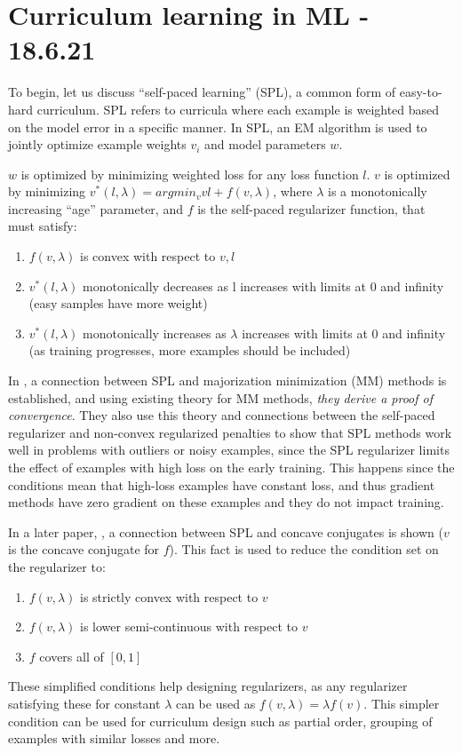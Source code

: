 \documentclass[letterpaper]{article}
\theoremstyle{definition}
\begin{document}
\section{Curriculum learning in ML - 18.6.21} \label{sec:CLML}

To begin, let us discuss ``self-paced learning'' (SPL), a common form of easy-to-hard curriculum.
SPL refers to curricula where each example is weighted based on the model error in a specific manner.
In SPL, an EM algorithm is used to jointly optimize example weights $v_i$ and model parameters $w$.

$w$ is optimized by minimizing weighted loss for any loss function $l$.
$v$ is optimized by minimizing $v^*(l,\lambda)=argmin_{v} vl + f(v, \lambda)$, where $\lambda$ is a monotonically increasing ``age'' parameter, and $f$ is the self-paced regularizer function, that must satisfy:
\begin{enumerate}
	\item $f(v, \lambda)$ is convex with respect to $v, l$
	\item $v^*(l,\lambda)$ monotonically decreases as l increases with limits at 0 and infinity (easy samples have more weight)
	\item $v^*(l,\lambda)$ monotonically increases as $\lambda$ increases with limits at 0 and infinity (as training progresses, more examples should be included)
\end{enumerate}

In \cite{Meng2017}, a connection between SPL and majorization minimization (MM) methods is established, and using existing theory for MM methods, \emph{they derive a proof of convergence}. They also use this theory and connections between the self-paced regularizer and non-convex regularized penalties to show that SPL methods work well in problems with outliers or noisy examples, since the SPL regularizer limits the effect of examples with high loss on the early training. This happens since the conditions mean that high-loss examples have constant loss, and thus gradient methods have zero gradient on these examples and they do not impact training.

In a later paper, \cite{Liu2018}, a connection between SPL and concave conjugates is shown ($v$ is the concave conjugate for $f$).
This fact is used to reduce the condition set on the regularizer to:
\begin{enumerate}
	\item $f(v, \lambda)$ is strictly convex with respect to $v$
	\item $f(v, \lambda)$ is lower semi-continuous with respect to $v$
	\item $f$ covers all of $[0,1]$
\end{enumerate}
These simplified conditions help designing regularizers, as any regularizer satisfying these for constant $\lambda$ can be used as $f(v, \lambda)=\lambda f(v)$. This simpler condition can be used for curriculum design such as partial order, grouping of examples with similar losses and more.
\end{document}
